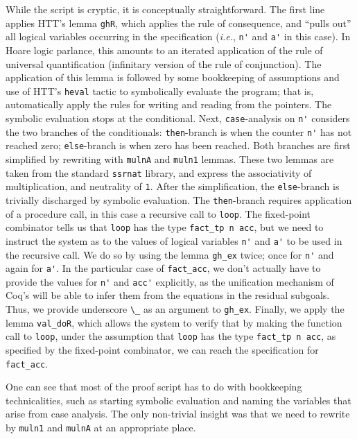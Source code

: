 \documentclass[blockstyle,preprint]{sigplanconf}
\newcommand{\is}[1]{\textcolor{blue}{(Ilya: {#1})}}
\newcommand{\an}[1]{\textcolor{red}{(Aleks: {#1})}}
\newcommand{\code}[1]{\lstinline{#1}}
\newcommand{\ie}{\emph{i.e.}\xspace}
\begin{document}
While the script is cryptic, it is conceptually straightforward.  The
first line applies HTT's lemma \code{ghR}, which applies the rule of
consequence, and ``pulls out'' all logical variables occurring in the
specification (\ie, \code{n'} and \code{a'} in this case). In Hoare
logic parlance, this amounts to an iterated application of the rule of
universal quantification (infinitary version of the rule of
conjunction). The application of this lemma is followed by some
bookkeeping of assumptions and use of HTT's \code{heval} tactic to
symbolically evaluate the program; that is, automatically apply the
rules for writing and reading from the pointers. The symbolic
evaluation stops at the conditional. Next, \code{case}-analysis on
\code{n'} considers the two branches of the conditionals:
\code{then}-branch is when the counter \code{n'} has not reached zero;
\code{else}-branch is when zero has been reached. Both branches are
first simplified by rewriting with \code{mulnA} and \code{muln1}
lemmas. These two lemmas are taken from the standard \code{ssrnat}
library, and express the associativity of multiplication, and
neutrality of \code{1}. After the simplification, the
\code{else}-branch is trivially discharged by symbolic evaluation. The
\code{then}-branch requires application of a procedure call, in this
case a recursive call to \code{loop}.  The fixed-point combinator
tells us that \code{loop} has the type \code{fact_tp n acc}, but we
need to instruct the system as to the values of logical variables
\code{n'} and \code{a'} to be used in the recursive call.  We do so by
using the lemma \code{gh_ex} twice; once for \code{n'} and again for
\code{a'}. In the particular case of \code{fact_acc}, we don't
actually have to provide the values for \code{n'} and \code{acc'}
explicitly, as the unification mechanism of Coq's will be able to
infer them from the equations in the residual subgoals. Thus, we
provide underscore \code{\_} as an argument to \code{gh_ex}. Finally,
we apply the lemma \code{val_doR}, which allows the system to verify
that by making the function call to \code{loop}, under the assumption
that \code{loop} has the type \code{fact_tp n acc}, as specified by
the fixed-point combinator, we can reach the specification for
\code{fact_acc}.

One can see that most of the proof script has to do with bookkeeping
technicalities, such as starting symbolic evaluation and naming the
variables that arise from case analysis. The only non-trivial insight
was that we need to rewrite by \code{muln1} and \code{mulnA} at an
appropriate place.
%
\end{document}

